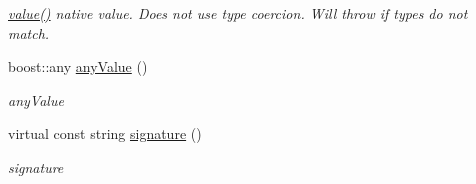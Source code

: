 \begin{DoxyCompactItemize}
\begin{DoxyCompactList}\small\item\em \hyperlink{classAbstractPropertyType_ae723621925382263eba046fa1ca8e36d}{value()} native value. Does not use type coercion. Will throw if types do not match. \end{DoxyCompactList}\item 
boost\+::any \hyperlink{classAbstractPropertyType_a7ba4118acb746d2b8fc220a12b0e2666}{any\+Value} ()
\begin{DoxyCompactList}\small\item\em any\+Value \end{DoxyCompactList}\item 
virtual const string \hyperlink{classAbstractPropertyType_ae87a5dc3ad7315c595a14959e4acedf1}{signature} ()
\begin{DoxyCompactList}\small\item\em signature \end{DoxyCompactList}\end{DoxyCompactItemize}
